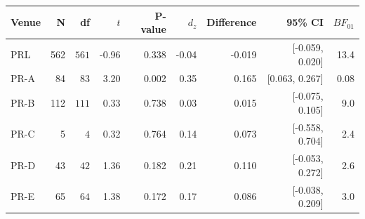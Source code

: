 \begin{tabular}{lrrrrrrrr}
\toprule
\textbf{Venue} & \textbf{N} & \textbf{df} & \textbf{$t$} & \textbf{P-value} & \textbf{$d_z$} & \textbf{Difference} & \textbf{95\% CI} & \textbf{$BF_{01}$} \\
\midrule
PRL & 562 & $561$ & -0.96 & 0.338 & -0.04 & -0.019 & [-0.059, 0.020] & 13.4 \\
PR-A & 84 & $83$ & 3.20 & 0.002 & 0.35 & 0.165 & [0.063, 0.267] & 0.08 \\
PR-B & 112 & $111$ & 0.33 & 0.738 & 0.03 & 0.015 & [-0.075, 0.105] & 9.0 \\
PR-C & 5 & $4$ & 0.32 & 0.764 & 0.14 & 0.073 & [-0.558, 0.704] & 2.4 \\
PR-D & 43 & $42$ & 1.36 & 0.182 & 0.21 & 0.110 & [-0.053, 0.272] & 2.6 \\
PR-E & 65 & $64$ & 1.38 & 0.172 & 0.17 & 0.086 & [-0.038, 0.209] & 3.0 \\
\bottomrule
\end{tabular}%
